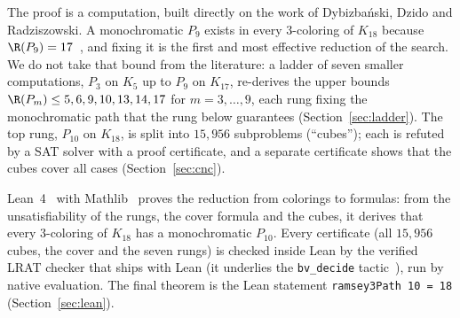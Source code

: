 The proof is a computation, built directly on the work of Dybizbański,
Dzido and Radziszowski. A monochromatic $P_9$ exists in every
$3$-coloring of $K_{18}$ because $\R(P_9)=17$~\cite{DDR16}, and fixing it
is the first and most effective reduction of the search. We do not take
that bound from the literature: a ladder of seven smaller computations,
$P_3$ on $K_5$ up to $P_9$ on $K_{17}$, re-derives the upper bounds
$\R(P_m)\le 5,6,9,10,13,14,17$ for $m=3,\dots,9$, each rung fixing the
monochromatic path that the rung below guarantees
(Section~\ref{sec:ladder}). The top rung, $P_{10}$ on $K_{18}$, is split
into $15{,}956$ subproblems (``cubes''); each is refuted by a SAT solver
with a proof certificate, and a separate certificate shows that the cubes
cover all cases (Section~\ref{sec:cnc}).

Lean~4~\cite{MU21} with Mathlib~\cite{Mathlib20} proves the reduction
from colorings to formulas: from the unsatisfiability of the rungs, the
cover formula and the cubes, it derives that every $3$-coloring of
$K_{18}$ has a monochromatic $P_{10}$. Every certificate (all $15{,}956$ cubes,
the cover and the seven rungs) is checked inside Lean by the verified LRAT
checker that ships with Lean (it underlies the \texttt{bv\_decide}
tactic~\cite{BBC+25}), run by native evaluation. The final theorem is the
Lean statement \texttt{ramsey3Path 10 = 18} (Section~\ref{sec:lean}).

